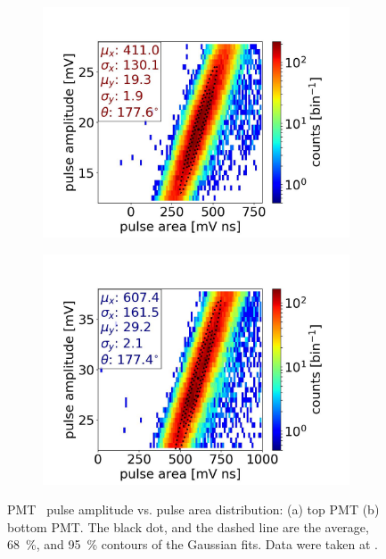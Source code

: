 \begin{figure}[!p]
	\centering
	\begin{subfigure}[b]{\twofigurewidth}
		\centering
		\includegraphics[width=\textwidth,clip,trim={0 0 0 0},angle=0,origin=c]{Figures/GasTest/DatasetQuality/topPMTArea65831.jpg}
		\caption{}
		\label{fig:PMTAmpArea top}
	\end{subfigure}
	\begin{subfigure}[b]{\twofigurewidth}
		\centering
		\includegraphics[width=\textwidth,clip,trim={0 0 0 0}]{Figures/GasTest/DatasetQuality/botPMTArea65831.jpg}
		\caption{}
		\label{fig:PMTAmpArea bottom}
	\end{subfigure}
	\caption[PMT \sphe\ pulse amplitude vs. pulse area distribution.]{PMT \sphe\ pulse amplitude vs. pulse area distribution: (a) top PMT (b) bottom PMT. The black dot, and the dashed line are the average, \SI{68}{\percent}, and \SI{95}{\percent} contours of the Gaussian fits. Data were taken at .}
	\label{fig:PMTAmpArea}
\end{figure}

